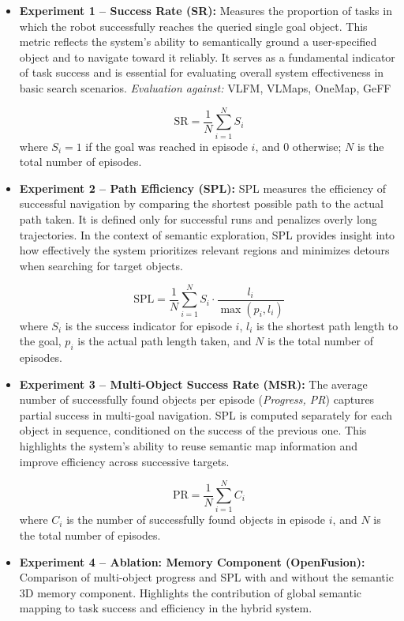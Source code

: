 \begin{itemize}
    \item \textbf{Experiment 1 – Success Rate (SR):}  
    Measures the proportion of tasks in which the robot successfully reaches the queried single goal object. This metric reflects the system’s ability to semantically ground a user-specified object and to navigate toward it reliably. It serves as a fundamental indicator of task success and is essential for evaluating overall system effectiveness in basic search scenarios.
    \textit{Evaluation against:} \ac{VLFM}, \ac{VLMaps}, \ac{OneMap}, \ac{GeFF}

    \[
    \text{SR} = \frac{1}{N} \sum_{i=1}^{N} S_i
    \]
    where \( S_i = 1 \) if the goal was reached in episode \( i \), and \( 0 \) otherwise; \( N \) is the total number of episodes.


    \item \textbf{Experiment 2 – Path Efficiency (SPL):}  
    SPL measures the efficiency of successful navigation by comparing the shortest possible path to the actual path taken. It is defined only for successful runs and penalizes overly long trajectories. In the context of semantic exploration, SPL provides insight into how effectively the system prioritizes relevant regions and minimizes detours when searching for target objects.

    \[
    \text{SPL} = \frac{1}{N} \sum_{i=1}^{N} S_i \cdot \frac{l_i}{\max(p_i, l_i)}
    \]
    where \( S_i \) is the success indicator for episode \( i \), \( l_i \) is the shortest path length to the goal, \( p_i \) is the actual path length taken, and \( N \) is the total number of episodes.

    \item \textbf{Experiment 3 – Multi-Object Success Rate (MSR):}  
    The average number of successfully found objects per episode (\textit{Progress, PR}) captures partial success in multi-goal navigation. SPL is computed separately for each object in sequence, conditioned on the success of the previous one. This highlights the system’s ability to reuse semantic map information and improve efficiency across successive targets.

    \[
    \text{PR} = \frac{1}{N} \sum_{i=1}^{N} C_i
    \]
    where \( C_i \) is the number of successfully found objects in episode \( i \), and \( N \) is the total number of episodes.

    \item \textbf{Experiment 4 – Ablation: Memory Component (OpenFusion):}  
    Comparison of multi-object progress and SPL with and without the semantic 3D memory component. Highlights the contribution of global semantic mapping to task success and efficiency in the hybrid system.


\end{itemize}

